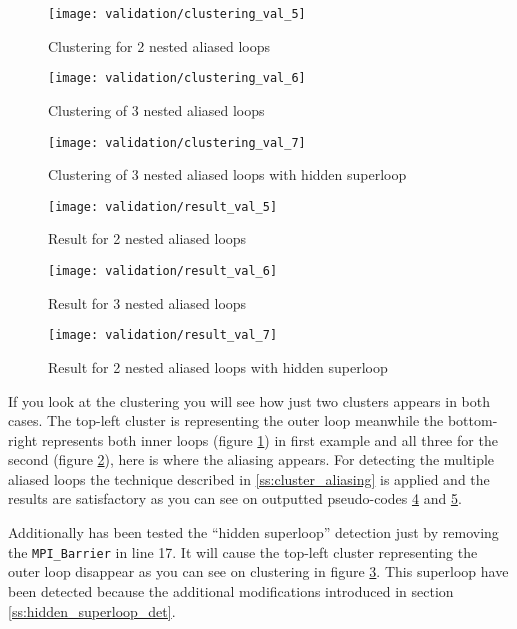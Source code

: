 \begin{multicols}{3}
  \begin{figure}[H]
    \centering
    \texttt{[image: validation/clustering\_val\_5]}
    \caption{Clustering for 2 nested aliased loops}
    \label{fig:clustering_val_5}
  \end{figure}
  \columnbreak
  \begin{figure}[H]
    \centering
    \texttt{[image: validation/clustering\_val\_6]}
    \caption{Clustering of 3 nested aliased loops}
    \label{fig:clustering_val_6}
  \end{figure}
  \columnbreak
  \begin{figure}[H]
    \centering
    \texttt{[image: validation/clustering\_val\_7]}
    \caption{Clustering of 3 nested aliased loops with hidden superloop}
    \label{fig:clustering_val_7}
  \end{figure}
\end{multicols}

\begin{figure}[H]
    \centering
    \texttt{[image: validation/result\_val\_5]}
    \caption{Result for 2 nested aliased loops}
    \label{fig:result_val_5}
\end{figure}
\begin{figure}[H]
    \centering
    \texttt{[image: validation/result\_val\_6]}
    \caption{Result for 3 nested aliased loops}
    \label{fig:result_val_6}
\end{figure}
\begin{figure}[H]
    \centering
    \texttt{[image: validation/result\_val\_7]}
    \caption{Result for 2 nested aliased loops with hidden superloop}
    \label{fig:result_val_7}
\end{figure}

If you look at the clustering you will see how just two clusters appears in both
cases. The top-left cluster is representing the outer loop meanwhile the bottom-right
represents both inner loops (figure \ref{fig:clustering_val_5}) in first example 
and all three for the second (figure \ref{fig:clustering_val_6}), here is where 
the aliasing appears. For detecting the multiple aliased loops the technique
described in \ref{ss:cluster_aliasing} is applied and the results are
satisfactory as you can see on outputted pseudo-codes \ref{fig:result_val_5} and
\ref{fig:result_val_6}.

Additionally has been tested the ``hidden superloop'' detection just by
removing the \texttt{MPI\_Barrier} in line 17. It will cause the top-left
cluster representing the outer loop disappear as you can see on clustering in
figure \ref{fig:clustering_val_7}. This superloop have been detected because the
additional modifications introduced in section \ref{ss:hidden_superloop_det}.

